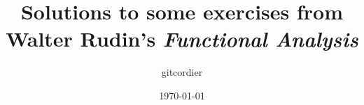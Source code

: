 \documentclass[a4paper,11pt,titlepage,openany, leqno]{book}
\def\ROOT{./}
\def\TITLE{
  Solutions to some exercises from Walter Rudin's \textit{Functional Analysis}
}
\def\AUTHOR{gitcordier}
\begin{document}
%    
\title{\TITLE}
\author{\AUTHOR}
\date{\today}
\maketitle

\renewcommand{\labelenumi}{$(\textit{\alph{enumi}}\,)$}
%
\frontmatter
\tableofcontents




\mainmatter
\renewcommand{\thechapter}{\arabic{chapter}}
\renewcommand{\thesection}{\arabic{section}}
\renewcommand{\thesubsection}{\arabic{subsection}}

%

{}
\end{document}
